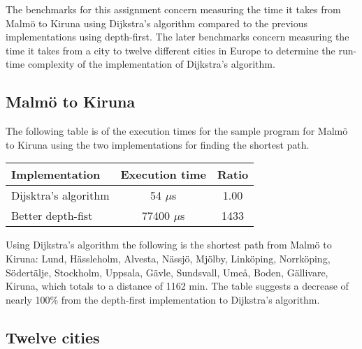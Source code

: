 \documentclass[a4paper,11pt]{article}
\begin{document}
    The benchmarks for this assignment concern measuring the time it takes from Malmö to Kiruna using Dijkstra's algorithm compared to the previous implementations using depth-first. The later benchmarks concern measuring the time it takes from a city to twelve different cities in Europe to determine the run-time complexity of the implementation of Dijkstra's algorithm.

    \subsection*{Malmö to Kiruna}

        The following table is of the execution times for the sample program for Malmö to Kiruna using the two implementations for finding the shortest path. 
        \begin{table}[h]
        \begin{center}
        \begin{tabular}{l|c|c}
        \textbf{Implementation} & \textbf{Execution time} & \textbf{Ratio} \\
        \hline
        Dijsktra's algorithm & 54 $\mu$s  & 1.00 \\
        Better depth-fist    & 77400 $\mu$s & 1433\\
        \end{tabular}
        \end{center}
        \end{table}
        
        Using Dijkstra's algorithm the following is the shortest path from Malmö to Kiruna: Lund, Hässleholm, Alvesta, Nässjö, Mjölby, Linköping, Norrköping, Södertälje, Stockholm, Uppsala, Gävle, Sundsvall, Umeå, Boden, Gällivare, Kiruna, which totals to a distance of 1162 min. The table suggests a decrease of nearly 100\% from the depth-first implementation to Dijkstra's algorithm.

    \subsection*{Twelve cities}
\end{document}
